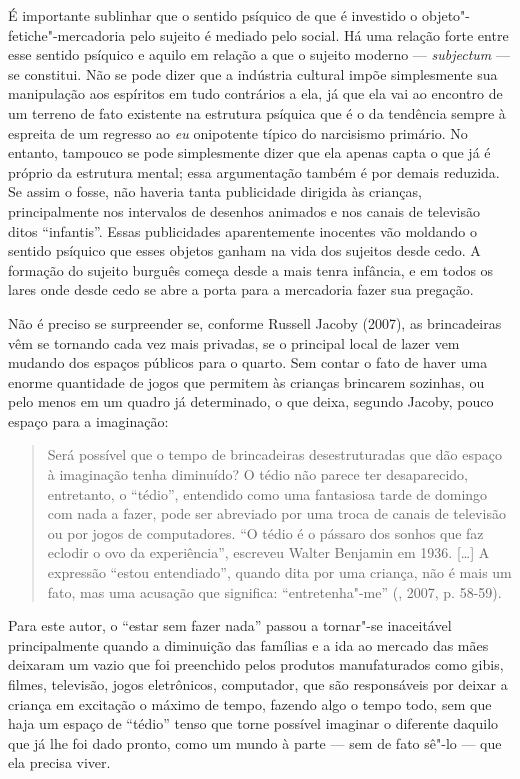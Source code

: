 É importante sublinhar que o sentido psíquico de que é investido o
objeto"-fetiche"-mercadoria pelo sujeito é mediado pelo social. Há uma
relação forte entre esse sentido psíquico e aquilo em relação a que o
sujeito moderno --- \emph{subjectum} --- se constitui. Não se pode dizer
que a indústria cultural impõe simplesmente sua manipulação aos
espíritos em tudo contrários a ela, já que ela vai ao encontro de um
terreno de fato existente na estrutura psíquica que é o da tendência
sempre à espreita de um regresso ao \emph{eu} onipotente típico do
narcisismo primário. No entanto, tampouco se pode simplesmente dizer que
ela apenas capta o que já é próprio da estrutura mental; essa
argumentação também é por demais reduzida. Se assim o fosse, não haveria
tanta publicidade dirigida às crianças, principalmente nos intervalos de
desenhos animados e nos canais de televisão ditos ``infantis''. Essas
publicidades aparentemente inocentes vão moldando o sentido psíquico que
esses objetos ganham na vida dos sujeitos desde cedo. A formação do
sujeito burguês começa desde a mais tenra infância, e em todos os lares
onde desde cedo se abre a porta para a mercadoria fazer sua pregação.

Não é preciso se surpreender se, conforme Russell Jacoby (2007), as
brincadeiras vêm se tornando cada vez mais privadas, se o principal
local de lazer vem mudando dos espaços públicos para o quarto. Sem
contar o fato de haver uma enorme quantidade de jogos que permitem às
crianças brincarem sozinhas, ou pelo menos em um quadro já determinado,
o que deixa, segundo Jacoby, pouco espaço para a imaginação:

\begin{quote}
Será possível que o tempo de brincadeiras desestruturadas que dão espaço
à imaginação tenha diminuído? O tédio não parece ter desaparecido,
entretanto, o ``tédio'', entendido como uma fantasiosa tarde de domingo
com nada a fazer, pode ser abreviado por uma troca de canais de
televisão ou por jogos de computadores. ``O tédio é o pássaro dos sonhos
que faz eclodir o ovo da experiência'', escreveu Walter Benjamin em 1936.
[\ldots{}] A expressão ``estou entendiado'', quando dita por uma criança,
não é mais um fato, mas uma acusação que significa: ``entretenha"-me''
(, 2007, p. 58-59).
\end{quote}

Para este autor, o ``estar sem fazer nada'' passou a tornar"-se
inaceitável principalmente quando a diminuição das famílias e a ida ao
mercado das mães deixaram um vazio que foi preenchido pelos produtos
manufaturados como gibis, filmes, televisão, jogos eletrônicos,
computador, que são responsáveis por deixar a
criança em excitação o máximo de tempo, fazendo algo o tempo todo, sem
que haja um espaço de ``tédio'' tenso que torne possível imaginar o
diferente daquilo que já lhe foi dado pronto, como um mundo à parte ---
sem de fato sê"-lo --- que ela precisa viver.

